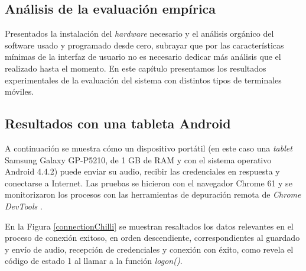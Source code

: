 \clearpage
{}%
\begin{center}
\begin{minipage}{.75\textwidth}
\section{Análisis de la evaluación empírica}

Presentados la instalación del \emph{hardware} necesario y el análisis orgánico del software usado y programado desde cero, subrayar que por las características mínimas de la interfaz de usuario no es necesario dedicar más análisis que el realizado hasta el momento. En este capítulo presentamos los resultados experimentales de la evaluación del sistema con distintos tipos de terminales móviles. %
\end{minipage}
\end{center}
\clearpage%

\subsection{Resultados con una tableta Android}
A continuación se muestra cómo un dispositivo portátil (en este caso una \emph{tablet} Samsung Galaxy GP-P5210, de 1 GB de RAM y con el sistema operativo Android 4.4.2) puede enviar su audio, recibir las credenciales en respuesta y conectarse a Internet. Las pruebas se hicieron con el navegador Chrome 61 y se monitorizaron los procesos con las herramientas de depuración remota de \emph{Chrome DevTools} \cite{ChromeDevTools}.
 
En la Figura \ref{connectionChilli} se muestran resaltados los datos relevantes en el proceso de conexión exitoso, en orden descendiente, correspondientes al guardado y envío de audio, recepción de credenciales y conexión con éxito, como revela el código de estado 1 al llamar a la función \emph{logon()}.

